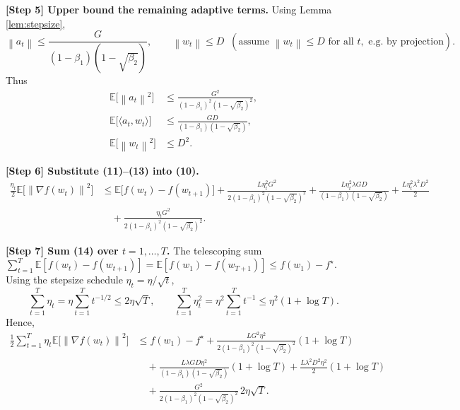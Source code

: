 \documentclass{article}
\newcommand{\EE}{\mathbb{E}}
\newcommand{\norm}[1]{\left\|#1\right\|}
\begin{document}
\medskip
\noindent\textbf{[Step 5] Upper bound the remaining adaptive terms.}
Using Lemma \ref{lem:stepsize},
\[
    \norm{a_t}\le \frac{G}{(1-\beta_1)(1-\sqrt{\beta_2})},\qquad
    \norm{w_t}\le D \;\;(\text{assume } \norm{w_t}\le D \text{ for all }t, \text{ e.g. by projection}).
\]
Thus
\begin{align}
    \EE\!\bigl[\norm{a_t}^{2}\bigr] &\le \frac{G^{2}}{(1-\beta_1)^{2}(1-\sqrt{\beta_2})^{2}}, \tag{11}\\
    \EE\!\bigl[\langle a_t,w_t\rangle\bigr] &\le \frac{G D}{(1-\beta_1)(1-\sqrt{\beta_2})}, \tag{12}\\
    \EE\!\bigl[\norm{w_t}^{2}\bigr] &\le D^{2}. \tag{13}
\end{align}

\medskip
\noindent\textbf{[Step 6] Substitute (11)–(13) into (10).}
\begin{align}
    \frac{\eta_t}{2}\EE\!\bigl[\norm{\nabla f(w_t)}^{2}\bigr]
    &\le \EE\!\bigl[f(w_t)-f(w_{t+1})\bigr]
      +\frac{L\eta_t^{2}G^{2}}{2(1-\beta_1)^{2}(1-\sqrt{\beta_2})^{2}}
      +\frac{L\eta_t^{2}\lambda G D}{(1-\beta_1)(1-\sqrt{\beta_2})}
      +\frac{L\eta_t^{2}\lambda^{2} D^{2}}{2} \nonumber\\
    &\quad +\frac{\eta_t G^{2}}{2(1-\beta_1)^{2}(1-\sqrt{\beta_2})^{2}}. \tag{14}
\end{align}

\medskip
\noindent\textbf{[Step 7] Sum (14) over $t=1,\dots,T$.}
The telescoping sum $\sum_{t=1}^{T}\EE[f(w_t)-f(w_{t+1})]=\EE[f(w_1)-f(w_{T+1})]\le f(w_1)-f^\star$.
Using the stepsize schedule $\eta_t=\eta/\sqrt{t}$,
\[
    \sum_{t=1}^{T}\eta_t = \eta\sum_{t=1}^{T}t^{-1/2}\le 2\eta\sqrt{T},\qquad
    \sum_{t=1}^{T}\eta_t^{2}= \eta^{2}\sum_{t=1}^{T}t^{-1}\le \eta^{2}(1+\log T). \tag{15}
\]
Hence,
\begin{align}
    \frac{1}{2}\sum_{t=1}^{T}\eta_t\EE\!\bigl[\norm{\nabla f(w_t)}^{2}\bigr]
    &\le f(w_1)-f^\star
      +\frac{L G^{2}\eta^{2}}{2(1-\beta_1)^{2}(1-\sqrt{\beta_2})^{2}}(1+\log T) \nonumber\\
    &\quad +\frac{L\lambda G D\eta^{2}}{(1-\beta_1)(1-\sqrt{\beta_2})}(1+\log T)
      +\frac{L\lambda^{2} D^{2}\eta^{2}}{2}(1+\log T) \nonumber\\
    &\quad +\frac{G^{2}}{2(1-\beta_1)^{2}(1-\sqrt{\beta_2})^{2}}\,2\eta\sqrt{T}. \tag{16}
\end{align}
\end{document}
